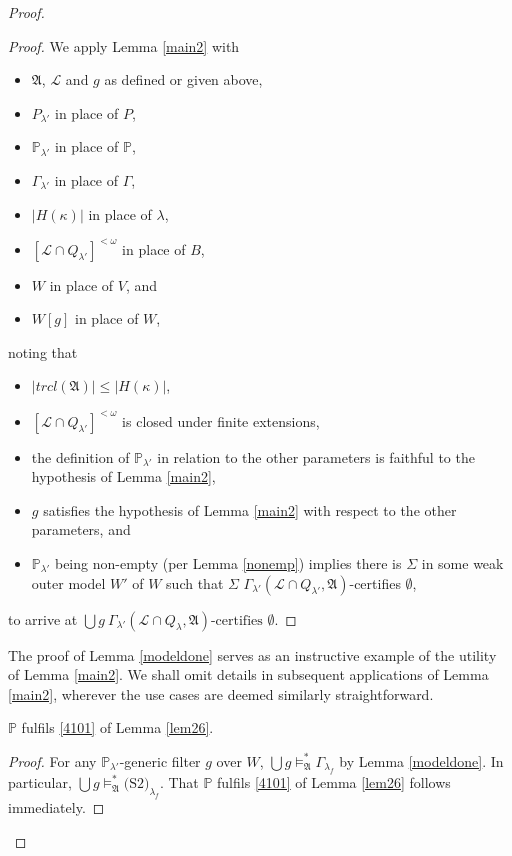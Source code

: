 \documentclass[12pt]{article}
\numberwithin{equation}{section}
\begin{document}
\begin{proof}
\begin{proof}
We apply Lemma \ref{main2} with 
\begin{itemize}
    \item $\mathfrak{A}$, $\mathcal{L}$ and $g$ as defined or given above,
    \item $P_{\lambda'}$ in place of $P$,
    \item $\mathbb{P}_{\lambda'}$ in place of $\mathbb{P}$, 
    \item $\Gamma_{\lambda'}$ in place of $\Gamma$,
    \item $|H(\kappa)|$ in place of $\lambda$,
    \item $[\mathcal{L} \cap Q_{\lambda'}]^{< \omega}$ in place of $B$,
    \item $W$ in place of $V$, and
    \item $W[g]$ in place of $W$,
\end{itemize}
noting that
\begin{itemize}
    \item $|trcl(\mathfrak{A})| \leq |H(\kappa)|$,
    \item $[\mathcal{L} \cap Q_{\lambda'}]^{< \omega}$ is closed under finite extensions,
    \item the definition of $\mathbb{P}_{\lambda'}$ in relation to the other parameters is faithful to the hypothesis of Lemma \ref{main2},
    \item $g$ satisfies the hypothesis of Lemma \ref{main2} with respect to the other parameters, and
    \item $\mathbb{P}_{\lambda'}$ being non-empty (per Lemma \ref{nonemp}) implies there is $\Sigma$ in some weak outer model $W'$ of $W$ such that $\Sigma$ $\Gamma_{\lambda'} (\mathcal{L} \cap Q_{\lambda'}, \mathfrak{A})$-certifies $\emptyset$,
\end{itemize}
to arrive at $\bigcup g \ \Gamma_{\lambda'} (\mathcal{L} \cap Q_{\lambda}, \mathfrak{A}) \text{-certifies } \emptyset$.
\end{proof}

The proof of Lemma \ref{modeldone} serves as an instructive example of the utility of Lemma \ref{main2}. We shall omit details in subsequent applications of Lemma \ref{main2}, wherever the use cases are deemed similarly straightforward. 

\begin{lem}\label{1done}
$\mathbb{P}$ fulfils \ref{4101} of Lemma \ref{lem26}.
\end{lem}

\begin{proof}
For any $\mathbb{P}_{\lambda'}$-generic filter $g$ over $W$, $\bigcup g \models^*_{\mathfrak{A}} \Gamma_{\lambda_f}$ by Lemma \ref{modeldone}. In particular, $\bigcup g \models^*_{\mathfrak{A}} \text{(S2)}_{\lambda_f}$. That $\mathbb{P}$ fulfils \ref{4101} of Lemma \ref{lem26} follows immediately.
\end{proof}


\end{proof}
\end{document}
